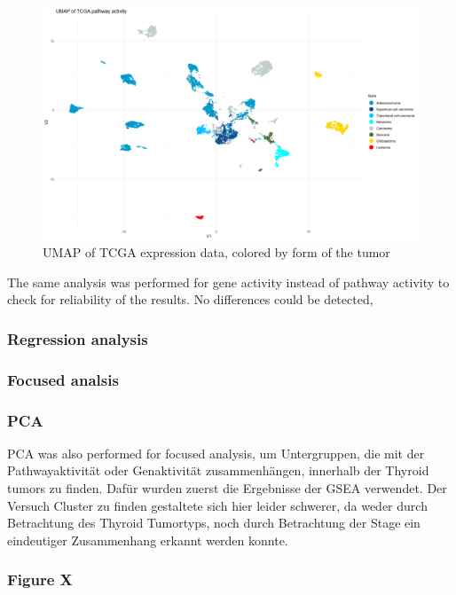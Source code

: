 \documentclass[
  parskip,
  oneside]{scrreprt}
\begin{document}
\begin{figure}

{\centering \includegraphics[width=0.5\linewidth]{figures/Pan Cancer UMAP cancer form} 

}

\caption{UMAP of TCGA expression data, colored by form of the tumor}\label{fig:UMAPPanForm}
\end{figure}

The same analysis was performed for gene activity instead of pathway
activity to check for reliability of the results. No differences could
be detected,

\hypertarget{regression-analysis}{%
\subsubsection{Regression analysis}\label{regression-analysis}}

\hypertarget{focused-analsis}{%
\subsubsection{Focused analsis}\label{focused-analsis}}

\hypertarget{pca-1}{%
\subsubsection{PCA}\label{pca-1}}

PCA was also performed for focused analysis, um Untergruppen, die mit
der Pathwayaktivität oder Genaktivität zusammenhängen, innerhalb der
Thyroid tumors zu finden. Dafür wurden zuerst die Ergebnisse der GSEA
verwendet. Der Versuch Cluster zu finden gestaltete sich hier leider
schwerer, da weder durch Betrachtung des Thyroid Tumortyps, noch durch
Betrachtung der Stage ein eindeutiger Zusammenhang erkannt werden
konnte.

\hypertarget{figure-x}{%
\subsubsection{Figure X}\label{figure-x}}
\end{document}
